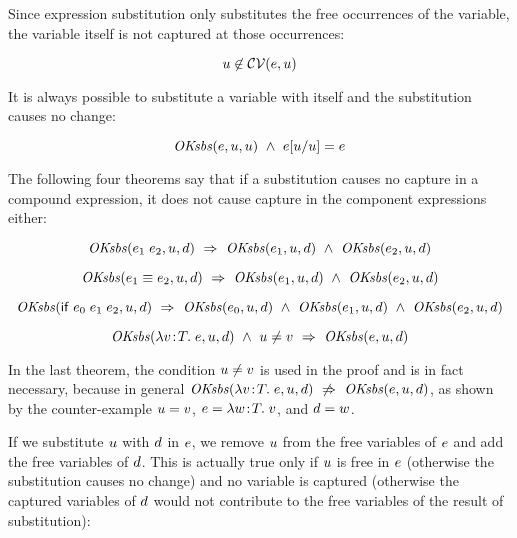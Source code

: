 Since expression substitution only substitutes the free occurrences of the
variable, the variable itself is not captured at those occurrences:

\begin{theorem}\label{thm-var-not-capt}
\[
u\not\in\mathcal{CV}(e,u)
\]
\end{theorem}

It is always possible to substitute a variable with itself and the
substitution causes no change:

\begin{theorem}\label{thm-esbs-id}
\[
\mathit{OKsbs}(e,u,u)\ \wedge\ 
e[u/u]=e
\]
\end{theorem}

The following four theorems say that if a substitution causes no capture in a
compound expression, it does not cause capture in the component expressions
either:

\begin{theorem}\label{thm-esbsok-app}
\[
\mathit{OKsbs}(e_1\;e_2,u,d)\ \Rightarrow\ \mathit{OKsbs}(e_1,u,d)\ \wedge\ \mathit{OKsbs}(e_2,u,d)
\]
\end{theorem}

\begin{theorem}\label{thm-esbsok-eq}
\[
\mathit{OKsbs}(e_1\equiv e_2,u,d)\ \Rightarrow\ \mathit{OKsbs}(e_1,u,d)\ \wedge\ \mathit{OKsbs}(e_2,u,d)
\]
\end{theorem}

\begin{theorem}\label{thm-esbsok-if}
\[
\mathit{OKsbs}(\mathsf{if}\;e_0\;e_1\;e_2,u,d)\ \Rightarrow\ 
\mathit{OKsbs}(e_0,u,d)\ \wedge\ \mathit{OKsbs}(e_1,u,d)\ \wedge\ \mathit{OKsbs}(e_2,u,d)
\]
\end{theorem}

\begin{theorem}\label{thm-esbsok-abs}
\[
\mathit{OKsbs}(\lambda v\!:\!T.\;e,u,d)\ \wedge\ u\neq v\ \Rightarrow\ \mathit{OKsbs}(e,u,d)
\]
\end{theorem}

In the last theorem, the condition $u\neq v$ is used in the proof and is
in fact necessary, because in general
$\mathit{OKsbs}(\lambda v\!:\!T.\;e,u,d)\ \not\Rightarrow\ \mathit{OKsbs}(e,u,d)$, as shown by the counter-example
$u=v$, $e=\lambda w\!:\!T.\;v$, and $d=w$.

If we substitute $u$ with $d$ in $e$, we remove $u$ from the
free variables of $e$ and add the free variables of $d$. This is
actually true only if $u$ is free in $e$ (otherwise the substitution
causes no change) and no variable is captured (otherwise the captured
variables of $d$ would not contribute to the free variables of the result
of substitution):

